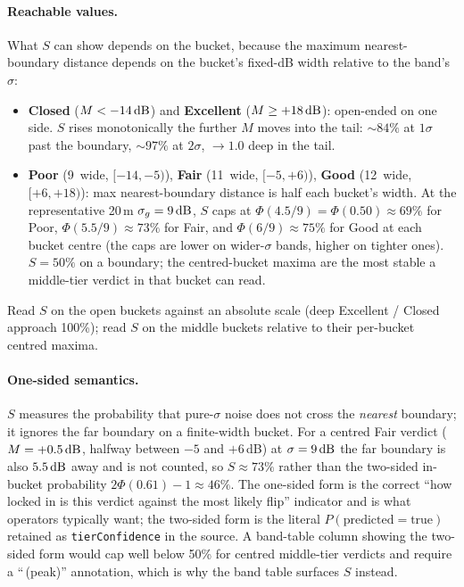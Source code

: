 \documentclass[11pt,a4paper]{article}
\newcommand{\SI}[2]{#1\,\text{#2}}
\newcommand{\dB}{\text{dB}}
\begin{document}
\paragraph{Reachable values.} What $S$ can show depends on the
bucket, because the maximum nearest-boundary distance depends on
the bucket's fixed-dB width relative to the band's $\sigma$:
\begin{itemize}[nosep]
  \item \textbf{Closed} ($M < \SI{-14}{\dB}$) and
        \textbf{Excellent} ($M \ge \SI{+18}{\dB}$): open-ended on
        one side. $S$ rises
        monotonically the further $M$ moves into the tail:
        $\sim 84\%$ at $1\sigma$ past the boundary, $\sim 97\%$ at
        $2\sigma$, $\to 1.0$ deep in the tail.
  \item \textbf{Poor} (\SI{9}{\dB} wide, $[-14, -5)$),
        \textbf{Fair} (\SI{11}{\dB} wide, $[-5, +6)$),
        \textbf{Good} (\SI{12}{\dB} wide, $[+6, +18)$): max
        nearest-boundary distance is half each bucket's width.
        At the representative 20\,m $\sigma_g = \SI{9}{\dB}$,
        $S$ caps at $\Phi(4.5/9) = \Phi(0.50) \approx 69\%$ for
        Poor, $\Phi(5.5/9) \approx 73\%$ for Fair, and
        $\Phi(6/9) \approx 75\%$ for Good at each bucket centre
        (the caps are lower on wider-$\sigma$ bands, higher on
        tighter ones).  $S = 50\%$ on a
        boundary; the centred-bucket maxima are the most stable a
        middle-tier verdict in that bucket can read.
\end{itemize}
Read $S$ on the open buckets against an absolute scale (deep
Excellent / Closed approach 100\%); read $S$ on the middle buckets
relative to their per-bucket centred maxima.

\paragraph{One-sided semantics.} $S$ measures the probability that
pure-$\sigma$ noise does not cross the \emph{nearest} boundary; it
ignores the far boundary on a finite-width bucket. For a centred
Fair verdict ($M = \SI{+0.5}{\dB}$, halfway between $-5$ and
$+6$\,dB) at $\sigma = \SI{9}{\dB}$
the far boundary is also $\SI{5.5}{\dB}$ away and is not counted, so
$S \approx 73\%$ rather than the two-sided in-bucket probability
$2\Phi(0.61) - 1 \approx 46\%$. The one-sided form is the correct
``how locked in is this verdict against the most likely flip''
indicator and is what operators typically want; the two-sided form
is the literal $P(\text{predicted} = \text{true})$ retained as
\texttt{tierConfidence} in the source.  A band-table
column showing the two-sided form would cap well below 50\%
for centred middle-tier verdicts and require a ``\,(peak)''
annotation, which is why the band table surfaces $S$ instead.
\end{document}
